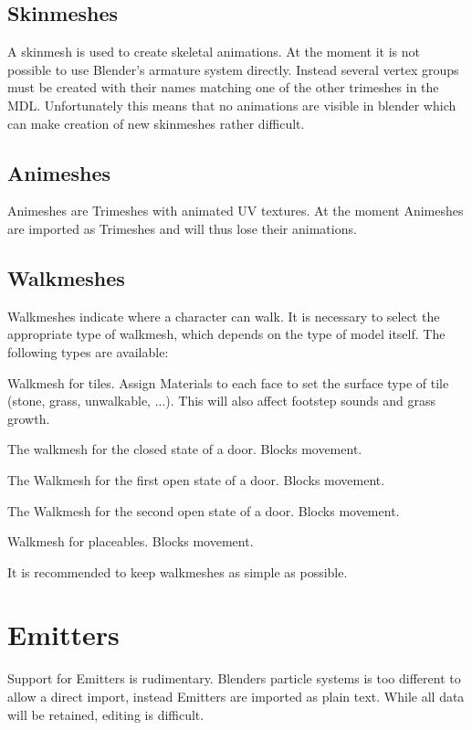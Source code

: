 \subsection{Skinmeshes}
A skinmesh is used to create skeletal animations. At the moment it is not 
possible to use Blender's armature system directly. Instead several vertex groups 
must be created with their names matching one of the other trimeshes in the MDL. 
Unfortunately this means that no animations are visible in blender which can make 
creation of new skinmeshes rather difficult.


\subsection{Animeshes}
Animeshes are Trimeshes with animated UV textures. At the moment Animeshes
are imported as Trimeshes and will thus lose their animations.


\subsection{Walkmeshes}
Walkmeshes indicate where a character can walk. It is necessary to select 
the appropriate type of walkmesh, which depends on the type of model itself. 
The following types are available:
\begin{description}[leftmargin=10em,style=nextline]
    \item[Tileset] Walkmesh for tiles. Assign Materials to each face to set the
                   surface type of tile (stone, grass, unwalkable, ...).
                   This will also affect footstep sounds and grass growth.
    \item[Door: Closed] The walkmesh for the closed state of a door. Blocks movement.
    \item[Door: Open 1] The Walkmesh for the first open state of a door. Blocks movement.
    \item[Door: Open 2] The Walkmesh for the second open state of a door. Blocks movement.
    \item[Placeable] Walkmesh for placeables. Blocks movement.
\end{description}
It is recommended to keep walkmeshes as simple as possible.

\section{Emitters}
Support for Emitters is rudimentary. Blenders particle systems is too
different to allow a direct import, instead Emitters are imported as plain
text. While all data will be retained, editing is difficult.


